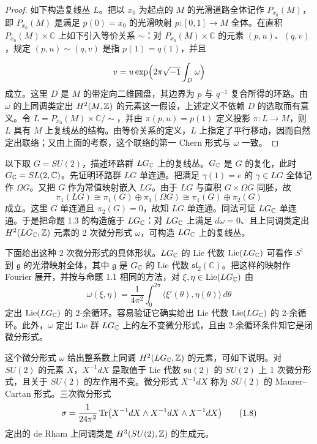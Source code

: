 \begin{proof}
  如下构造复线丛 $L$。把以 $x_{0}$ 为起点的 $M$ 的光滑道路全体记作 $P_{x_{0}}(M)$，即 $P_{x_{0}}(M)$ 是满足 $p(0)=x_{0}$ 的光滑映射 $p\colon[0,1]\to M$ 全体。在直积 $P_{x_{0}}(M)\times\mathbb{C}$ 上如下引入等价关系 $\sim$：对 $P_{x_{0}}(M)\times\mathbb{C}$ 的元素 $(p,u)$、$(q,v)$，规定 $(p,u)\sim(q,v)$ 是指 $p(1)=q(1)$，并且

  \[
    v=u\exp\Bigl(2\pi\sqrt{-1}\int_{D}\omega\Bigr)
  \]
  成立。这里 $D$ 是 $M$ 的带定向二维圆盘，其边界为 $p$ 与 $q^{-1}$ 复合所得的环路。由 $\omega$ 的上同调类定出 $H^{2}(M,\mathbb{Z})$ 的元素这一假设，上述定义不依赖 $D$ 的选取而有意义。令 $L=P_{x_{0}}(M)\times\mathbb{C}/\sim$，并由 $\pi(p,u)=p(1)$ 定义投影 $\pi\colon L\to M$，则 $L$ 具有 $M$ 上复线丛的结构。由等价关系的定义，$L$ 上指定了平行移动，因而自然定出联络；又由上面的考察，这个联络的第一 Chern 形式与 $\omega$ 一致。
\end{proof}

以下取 $G=SU(2)$，描述环路群 $LG_{\mathbb{C}}$ 上的复线丛。$G_{\mathbb{C}}$ 是 $G$ 的复化，此时 $G_{\mathbb{C}}=SL(2,\mathbb{C})$。先证明环路群 $LG$ 单连通。把满足 $\gamma(1)=e$ 的 $\gamma\in LG$ 全体记作 $\Omega G$。又把 $G$ 作为常值映射嵌入 $LG$。由于 $LG$ 与直积 $G\times\Omega G$ 同胚，故
\[
  \pi_{1}(LG)\cong\pi_{1}(G)\oplus\pi_{1}(\Omega G)\cong\pi_{1}(G)\oplus\pi_{2}(G)
\]
成立。这里 $G$ 单连通且 $\pi_{2}(G)=0$，故知 $LG$ 单连通。同法可证 $LG_{\mathbb{C}}$ 单连通。于是把命题 1.3 的构造施于 $LG_{\mathbb{C}}$：对 $LG_{\mathbb{C}}$ 上满足 $d\omega=0$、且上同调类定出 $H^{2}(LG_{\mathbb{C}},\mathbb{Z})$ 元素的 2 次微分形式 $\omega$，可构造 $LG_{\mathbb{C}}$ 上的复线丛。

下面给出这种 2 次微分形式的具体形状。$LG_{\mathbb{C}}$ 的 Lie 代数 $\operatorname{Lie}(LG_{\mathbb{C}})$ 可看作 $S^{1}$ 到 $\mathfrak{g}$ 的光滑映射全体，其中 $\mathfrak{g}$ 是 $G_{\mathbb{C}}$ 的 Lie 代数 $\mathfrak{sl}_{2}(\mathbb{C})$。把这样的映射作 Fourier 展开，并按与命题 1.1 相同的方法，对 $\xi,\eta\in\operatorname{Lie}(LG_{\mathbb{C}})$ 由
\begin{equation}
  \omega(\xi,\eta)=\frac{1}{4\pi^{2}}\int_{0}^{2\pi}
  \langle \xi'(\theta),\eta(\theta)\rangle\,d\theta \tag{1.7}
\end{equation}
定出 $\operatorname{Lie}(LG_{\mathbb{C}})$ 的 2-余循环。容易验证它确实给出 Lie 代数 $\operatorname{Lie}(LG_{\mathbb{C}})$ 的 2-余循环。此外，$\omega$ 定出 Lie 群 $LG_{\mathbb{C}}$ 上的左不变微分形式，且由 2-余循环条件知它是闭微分形式。


这个微分形式 $\omega$ 给出整系数上同调 $H^{2}(LG_{\mathbb{C}},\mathbb{Z})$ 的元素，可如下说明。对 $SU(2)$ 的元素 $X$，$X^{-1}dX$ 是取值于 Lie 代数 $\mathfrak{su}(2)$ 的 $SU(2)$ 上 1 次微分形式，且关于 $SU(2)$ 的左作用不变。微分形式 $X^{-1}dX$ 称为 $SU(2)$ 的 Maurer--Cartan 形式。三次微分形式
\begin{equation}
  \sigma=\frac{1}{24\pi^{2}}\operatorname{Tr}\bigl(X^{-1}dX\wedge X^{-1}dX\wedge X^{-1}dX\bigr) \tag{1.8}
\end{equation}
定出的 de Rham 上同调类是 $H^{3}(SU(2),\mathbb{Z})$ 的生成元。

